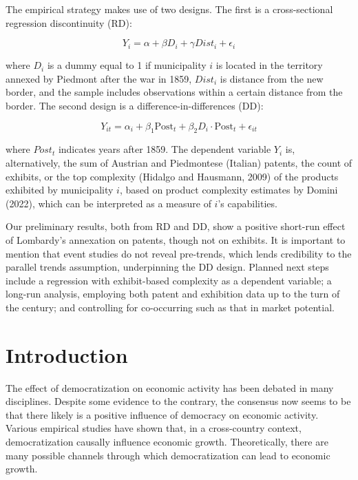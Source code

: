 The empirical strategy makes use of two designs. The first is a cross-sectional regression discontinuity (RD):

\begin{equation*}
    Y_{i} = \alpha + \beta D_i + \gamma Dist_i + \epsilon_i 
\end{equation*}

\noindent where $ D_i $ is a dummy equal to 1 if municipality $ i $ is located in the territory annexed by Piedmont after the war in 1859, $ Dist_i $ is distance from the new border, and the sample includes observations within a certain distance from the border. The second design is a difference-in-differences (DD):

\begin{equation*}
    Y_{it} = \alpha_i + \beta_1 \text{Post}_t + \beta_2 D_i \cdot \text{Post}_t + \epsilon_{it}
\end{equation*}

\noindent where $ Post_t $ indicates years after 1859. The dependent variable $ Y_i $ is, alternatively, the sum of Austrian and Piedmontese (Italian) patents, the count of exhibits, or the top complexity (Hidalgo and Hausmann, 2009) of the products exhibited by municipality $ i $, based on product complexity estimates by Domini (2022), which can be interpreted as a measure of $ i $'s capabilities.

Our preliminary results, both from RD and DD, show a positive short-run effect of Lombardy's annexation on patents, though not on exhibits. It is important to mention that event studies do not reveal pre-trends, which lends credibility to the parallel trends assumption, underpinning the DD design. Planned next steps include a regression with exhibit-based complexity as a dependent variable; a long-run analysis, employing both patent and exhibition data up to the turn of the century; and controlling for co-occurring such as that in market potential.  


\section{Introduction}

The effect of democratization on economic activity has been debated in many disciplines. Despite some evidence to the contrary, the consensus now seems to be that there likely is a positive influence of democracy on economic activity. Various empirical studies have shown that, in a cross-country context, democratization causally influence economic growth. Theoretically, there are many possible channels through which democratization can lead to economic growth. %

